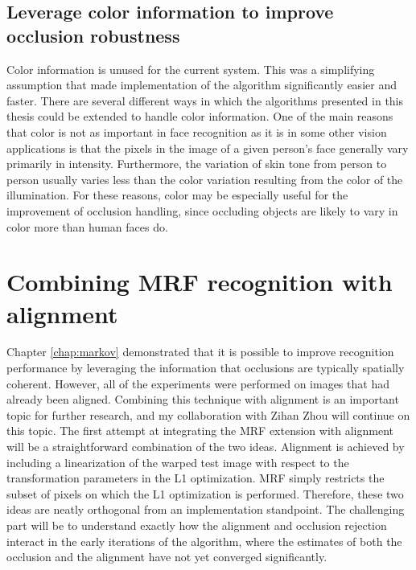 \subsection{Leverage color information to improve occlusion robustness}  Color information is unused for the current system.  This was a simplifying assumption that made implementation of the algorithm significantly easier and faster.  There are several different ways in which the algorithms presented in this thesis could be extended to handle color information.  One of the main reasons that color is not as important in face recognition as it is in some other vision applications is that the pixels in the image of a given person's face generally vary primarily in intensity.  Furthermore, the variation of skin tone from person to person usually varies less than the color variation resulting from the color of the illumination.  For these reasons, color may be especially useful for the improvement of occlusion handling, since occluding objects are likely to vary in color more than human faces do.  


\section{Combining MRF recognition with alignment} Chapter \ref{chap:markov} demonstrated that it is possible to improve recognition performance by leveraging the information that occlusions are typically spatially coherent.  However, all of the experiments were performed on images that had already been aligned.  Combining this technique with alignment is an important topic for further research, and my collaboration with Zihan Zhou will continue on this topic.  The first attempt at integrating the MRF extension with alignment will be a straightforward combination of the two ideas.  Alignment is achieved by including a linearization of the warped test image with respect to the transformation parameters in the L1 optimization.  MRF simply restricts the subset of pixels on which the L1 optimization is performed.  Therefore, these two ideas are neatly orthogonal from an implementation standpoint.  The challenging part will be to understand exactly how the alignment and occlusion rejection interact in the early iterations of the algorithm, where the estimates of both the occlusion and the alignment have not yet converged significantly.


